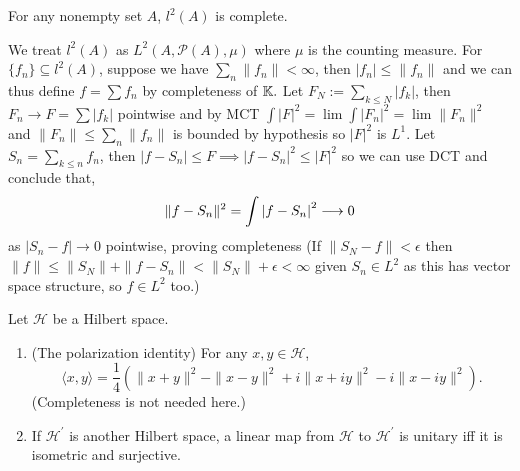 \documentclass[12pt,a4paper]{article}
\begin{document}
\begin{problem}\label{prob:5-54}
For any nonempty set $A$, $l^2(A)$ is complete.
\end{problem}
\begin{solution}
    We treat $l^2(A)$ as $L^2(A,\mathcal P(A),\mu)$ where $\mu$ is the counting measure. 
    For $\{f_n\} \subseteq l^2(A)$, suppose we have $\sum_n\|f_n\|<\infty$, then $|f_n|\leq\|f_n\|$ and we can thus define $f=\sum f_n$ by completeness of $\mathbb{K}.$ 
    Let $F_N:=\sum_{k\leq N}|f_k|$, then $F_n\to F=\sum|f_k|$ pointwise and by MCT $\int|F|^2=\lim\int|F_n|^2=\lim\|F_n\|^2$ and $\|F_n\|\leq\sum_n\|f_n\|$ is bounded by hypothesis so $|F|^2$ is $L^1$. 
    Let $S_n=\sum_{k\leq n}f_n$, then $|f-S_n|\leq F\implies |f-S_n|^2\leq|F|^2$ so we can use DCT and conclude that, 
    \[
        \|f-S_n\|^2=\int\qty|f-S_n|^2\longrightarrow 0
    \]
    as $|S_n-f|\to 0$ pointwise, proving completeness (If $\|S_N-f\|<\epsilon$ then $\|f\|\leq\|S_N\|+\|f-S_n\|<\|S_N\|+\epsilon<\infty$ given $S_n\in L^2$ as this has vector space structure, so $f\in L^2$ too.) 
\end{solution}
\begin{problem}\label{prob:5-55}
Let $\mathcal{H}$ be a Hilbert space.
\begin{enumerate}[label=\alph*.]
\item (The polarization identity) For any $x,y \in \mathcal{H}$,
$$\langle x,y \rangle = \frac{1}{4} (\|x+y\|^2 - \|x-y\|^2 + i\|x+iy\|^2 - i\|x-iy\|^2).$$
(Completeness is not needed here.)
\item If $\mathcal{H}^\prime$ is another Hilbert space, a linear map from $\mathcal{H}$ to $\mathcal{H}^\prime$ is unitary iff it is isometric and surjective.
\end{enumerate}
\end{problem}
\end{document}
